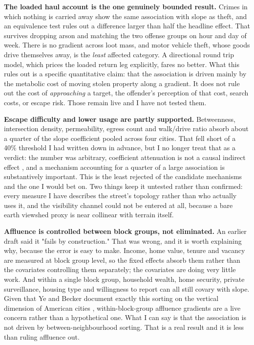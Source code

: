 \documentclass[12pt,letterpaper]{article}
\begin{document}
\textbf{The loaded haul account is the one genuinely bounded result.} Crimes in which
nothing is carried away show the same association with slope as theft, and an
equivalence test rules out a difference larger than half the headline effect. That
survives dropping arson and matching the two offense groups on hour and day of week.
There is no gradient across loot mass, and motor vehicle theft, whose goods drive
themselves away, is the \emph{least} affected category. A directional round trip
model, which prices the loaded return leg explicitly, fares no better. What this
rules out is a specific quantitative claim: that the association is driven mainly by
the metabolic cost of moving stolen property along a gradient. It does not rule out
the cost of \emph{approaching} a target, the offender's perception of that cost,
search costs, or escape risk. Those remain live and I have not tested them.

\textbf{Escape difficulty and lower usage are partly supported.} Betweenness,
intersection density, permeability, egress count and walk/drive ratio absorb about a
quarter of the slope coefficient pooled across four cities. That fell short of a 40\%
threshold I had written down in advance, but I no longer treat that as a verdict: the
number was arbitrary, coefficient attenuation is not a causal indirect effect
\citep{imai2010}, and a mechanism accounting for a quarter of a large association is
substantively important. This is the least rejected of the candidate mechanisms and
the one I would bet on. Two things keep it untested rather than confirmed: every
measure I have describes the street's topology rather than who actually uses it, and
the visibility channel could not be entered at all, because a bare earth viewshed
proxy is near collinear with terrain itself.

\textbf{Affluence is controlled between block groups, not eliminated.} An earlier
draft said it "fails by construction." That was wrong, and it is worth explaining
why, because the error is easy to make. Income, home value, tenure and vacancy are
measured at block group level, so the fixed effects absorb them rather than the
covariates controlling them separately; the covariates are doing very little work. And
within a single block group, household wealth, home security, private surveillance,
housing type and willingness to report can all still covary with slope. Given that Ye
and Becker document exactly this sorting on the vertical dimension of American cities
\citep{yebecker2018}, within-block-group affluence gradients are a live concern rather
than a hypothetical one. What I can say is that the association is not driven by
between-neighbourhood sorting. That is a real result and it is less than ruling
affluence out.
\end{document}
